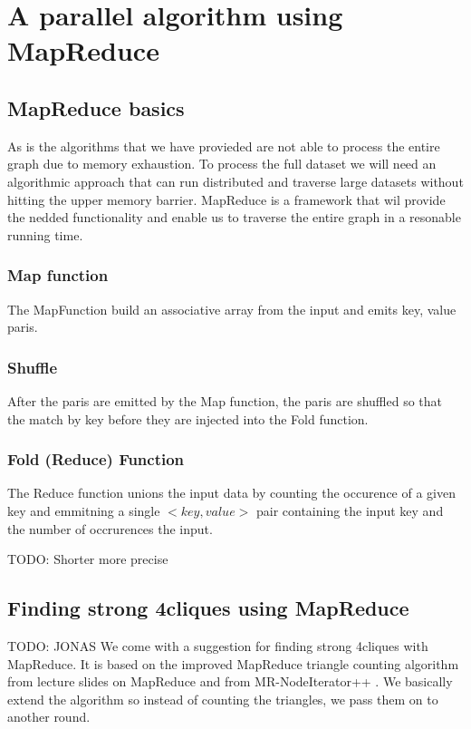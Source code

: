 \documentclass{article}
\begin{document}
\section{A parallel algorithm using MapReduce}

\subsection{MapReduce basics}
As is the algorithms that we have provieded are not able to process the entire graph due to memory exhaustion. To process the full dataset we will need an algorithmic approach that can run distributed and traverse large datasets without hitting the upper memory barrier. MapReduce is a framework that wil provide the nedded functionality and enable us to traverse the entire graph in a resonable running time.

\subsubsection{Map function}
The MapFunction build an associative array from the input and emits key, value paris.

\subsubsection{Shuffle}
After the paris are emitted by the Map function, the paris are shuffled so that the match by key before they are injected into the Fold function.

\subsubsection{Fold (Reduce) Function}
The Reduce function unions the input data by counting the occurence of a given key and emmitning a single $<key,value>$ pair containing the input key and the number of occrurences the input.

TODO: Shorter more precise

\subsection{Finding strong 4cliques using MapReduce}
TODO: JONAS
We come with a suggestion for finding strong 4cliques with MapReduce. It is based on the improved MapReduce triangle counting algorithm from lecture slides on MapReduce \cite{lnMapReduce} and from MR-NodeIterator++ \cite{countingTriangles}. We basically extend the algorithm so instead of counting the triangles, we pass them on to another round.
\end{document}
